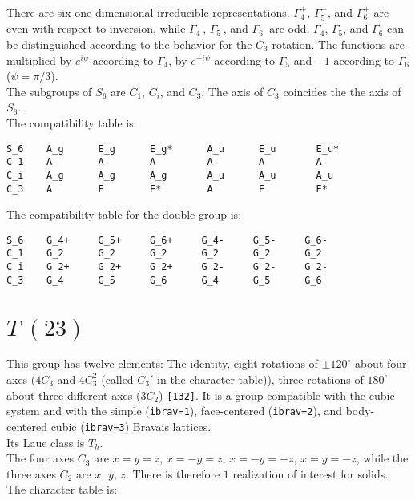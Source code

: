 \documentclass[12pt,a4paper,twoside]{report}
\begin{document}
There are six one-dimensional irreducible representations. $\Gamma_4^+$,
$\Gamma_5^+$, and $\Gamma_6^+$ are even with respect to inversion, while
$\Gamma_4^-$, $\Gamma_5^-$, and $\Gamma_6^-$ are odd. $\Gamma_4$, $\Gamma_5$,
and $\Gamma_6$ can be distinguished according to the behavior for the
$C_3$ rotation. The functions are multiplied by $e^{i\psi}$ according to
$\Gamma_4$, by $e^{-i\psi}$ according to $\Gamma_5$ and $-1$ according
to $\Gamma_6$ ($\psi=\pi/3$). \\
The subgroups of $S_6$ are $C_1$, $C_i$, and $C_3$. The axis of $C_3$ coincides
the the axis of $S_6$. \\
The compatibility table is:

\begin{tcolorbox}
\begin{footnotesize}
\begin{verbatim}
S_6    A_g      E_g      E_g*      A_u      E_u       E_u*  
C_1    A        A        A         A        A         A
C_i    A_g      A_g      A_g       A_u      A_u       A_u
C_3    A        E        E*        A        E         E*
\end{verbatim}
\end{footnotesize}
\end{tcolorbox}

The compatibility table for the double group is:

\begin{tcolorbox}
\begin{footnotesize}
\begin{verbatim}
S_6    G_4+     G_5+     G_6+     G_4-     G_5-     G_6-  
C_1    G_2      G_2      G_2      G_2      G_2      G_2
C_i    G_2+     G_2+     G_2+     G_2-     G_2-     G_2-
C_3    G_4      G_5      G_6      G_4      G_5      G_6 
\end{verbatim}
\end{footnotesize}
\end{tcolorbox}

\newpage
{\color{coral}\section{$T\ (23)$}} 
\color{black}
This group has twelve elements: The identity, eight rotations of $\pm120^\circ$ 
about four axes ($4C_3$ and $4C_3^2$ (called $C_3'$ in the character
table)), three rotations of $180^\circ$ about three different axes ($3C_2$)
\texttt{[132]}.
It is a group compatible with the cubic system and with the  
simple (\texttt{ibrav=1}), face-centered (\texttt{ibrav=2}), 
and body-centered cubic (\texttt{ibrav=3}) Bravais lattices. \\
Its Laue class is $T_{h}$. \\
The four axes $C_3$ are $x=y=z$, $x=-y=z$, $x=-y=-z$, $x=y=-z$, while
the three axes $C_2$ are $x$, $y$, $z$. There is therefore $1$
realization of interest for solids. \\
The character table is:
\end{document}
